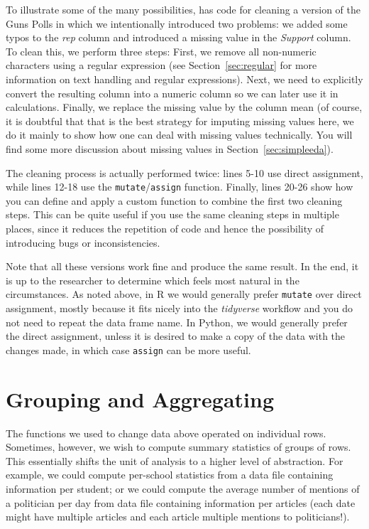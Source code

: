 
To illustrate some of the many possibilities,  has code for cleaning a version of the Guns Polls
in which we intentionally introduced two problems: we added some typos to the \emph{rep} column
and introduced a missing value in the \emph{Support} column.
To clean this, we perform three steps: First, we remove all non-numeric characters using a regular expression
(see Section~\ref{sec:regular} for more information on text handling and regular expressions).
Next, we need to explicitly convert the resulting column into a numeric column so we can later use it in calculations.
Finally, we replace the missing value by the column mean
(of course, it is doubtful that that is the best strategy for imputing missing values here,
we do it mainly to show how one can deal with missing values technically. You will find some more discussion about missing values in Section~\ref{sec:simpleeda}).

The cleaning process is actually performed twice: lines 5-10 use direct assignment,
while lines 12-18 use the \texttt{mutate}/\texttt{assign} function.
Finally, lines 20-26 show how you can define and apply a custom function to combine the first two cleaning steps.
This can be quite useful if you use the same cleaning steps in multiple places,
since it reduces the repetition of code and hence the possibility of introducing bugs or inconsistencies.

Note that all these versions work fine and produce the same result.
In the end, it is up to the researcher to determine which feels most natural in the circumstances.
As noted above, in R we would generally prefer \texttt{mutate} over direct assignment,
mostly because it fits nicely into the \emph{tidyverse} workflow and you do not need to repeat the data frame name.
In Python, we would generally prefer the direct assignment, unless it is desired to make a copy of the data
with the changes made, in which case \texttt{assign} can be more useful.

\section{Grouping and Aggregating} \label{sec:grouping}

The functions we used to change data above operated on individual rows.
Sometimes, however, we wish to compute summary statistics of groups of rows.
This essentially shifts the unit of analysis to a higher level of abstraction.
For example, we could compute per-school statistics from a data file containing information per student;
or we could compute the average number of mentions of a politician per day from data file containing information per articles (each date might have multiple articles and each article multiple mentions to politicians!).

